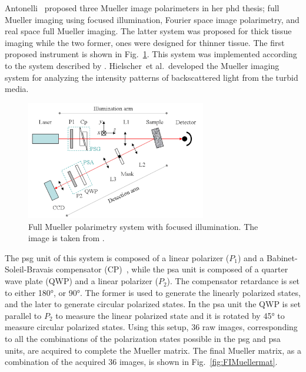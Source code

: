 Antonelli~\cite{antonelli2011biomedical} proposed three Mueller image polarimeters in her phd thesis; full Mueller imaging using focused illumination, Fourier space image polarimetry, and real space full Mueller imaging.
The latter system was proposed for thick tissue imaging while the two former, ones were designed for thinner tissue.
The first proposed instrument is shown in Fig.~\ref{fig:FIMueller}.
This system was implemented according to the system described by \cite{hielscher1997diffuse}.
Hielscher~et al.\,\cite{hielscher1997diffuse} developed the Mueller imaging system for analyzing the intensity patterns of backscattered light from the turbid media.
\begin{figure}[H]
\begin{center}
\includegraphics[width = 0.7\textwidth] {Chapter4/Figures/FIMueller.png}
\end{center}
\caption[Full Mueller polarimetry using focused illumination~\cite{antonelli2011biomedical}]{Full Mueller polarimetry system with focused illumination. The image is taken from \cite{antonelli2011biomedical}.}
\label{fig:FIMueller}
\end{figure}
\noindent The \ac{psg} unit of this system is composed of a linear polarizer ($P_{1}$) and a Babinet-Soleil-Bravais compensator (CP)~\cite{antonelli2011biomedical}, while the \ac{psa} unit is composed of a quarter wave plate (QWP) and a linear polarizer ($P_{2}$).
The compensator retardance is set to either \ang{180}, or \ang{90}.
The former is used to generate the linearly polarized states, and the later to generate circular polarized states.
In the \ac{psa} unit the QWP is set parallel to $P_{2}$ to measure the linear polarized state and it is rotated by \ang{45} to measure circular polarized states.
Using this setup, 36 raw images, corresponding to all the combinations of the polarization states possible in the \ac{psg} and \ac{psa} units, are acquired to complete the Mueller matrix. 
The final Mueller matrix, as a combination of the acquired 36 images, is shown in Fig.~\ref{fig:FIMuellermat}.
